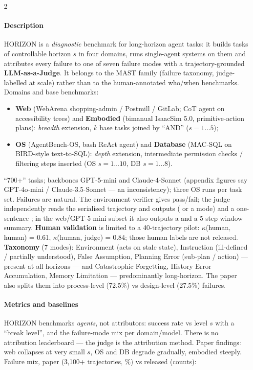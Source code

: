 \begin{multicols}{2}
\paragraph{Description} HORIZON is a \emph{diagnostic} benchmark for long-horizon agent tasks: it builds tasks of controllable horizon $s$ in four domains, runs single-agent systems on them and attributes every failure to one of seven failure modes with a trajectory-grounded \textbf{LLM-as-a-Judge}. It belongs to the MAST family (failure taxonomy, judge-labelled at scale) rather than to the human-annotated who/when benchmarks. Domains and base benchmarks:
\begin{itemize}
\item \textbf{Web} (WebArena shopping-admin / Postmill / GitLab; CoT agent on accessibility trees) and \textbf{Embodied} (bimanual IsaacSim 5.0, primitive-action plans): \emph{breadth} extension, $k$ base tasks joined by ``AND'' ($s{=}1\ldots5$);
\item \textbf{OS} (AgentBench-OS, bash ReAct agent) and \textbf{Database} (MAC-SQL on BIRD-style text-to-SQL): \emph{depth} extension, intermediate permission checks / filtering steps inserted (OS $s{=}1\ldots10$, DB $s{=}1\ldots8$).
\end{itemize}
``700+'' tasks; backbones GPT-5-mini and Claude-4-Sonnet (appendix figures say GPT-4o-mini / Claude-3.5-Sonnet --- an inconsistency); three OS runs per task set. Failures are natural. The environment verifier gives pass/fail; the judge independently reads the serialised trajectory and outputs  ( or a mode) and a one-sentence ; in the web/GPT-5-mini subset it also outputs a  and a 5-step window summary. \textbf{Human validation} is limited to a 40-trajectory pilot: $\kappa$(human, human) = 0.61, $\kappa$(human, judge) = 0.84; those human labels are not released. \textbf{Taxonomy} (7 modes): Environment (acts on stale state), Instruction (ill-defined / partially understood), False Assumption, Planning Error (sub-plan / action) --- present at all horizons --- and Catastrophic Forgetting, History Error Accumulation, Memory Limitation --- predominantly long-horizon. The paper also splits them into process-level (72.5\%) vs design-level (27.5\%) failures.

\paragraph{Metrics and baselines} HORIZON benchmarks \emph{agents}, not attributors: success rate vs level $s$ with a ``break level'', and the failure-mode mix per domain/model. There is no attribution leaderboard --- the judge is the attribution method. Paper findings: web collapses at very small $s$, OS and DB degrade gradually, embodied steeply. Failure mix, paper (3,100+ trajectories, \%) vs released  (counts):


\end{multicols}
